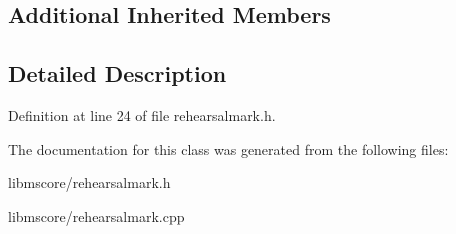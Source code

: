 \subsection*{Additional Inherited Members}


\subsection{Detailed Description}


Definition at line 24 of file rehearsalmark.\+h.



The documentation for this class was generated from the following files\+:\begin{DoxyCompactItemize}
\item 
libmscore/rehearsalmark.\+h\item 
libmscore/rehearsalmark.\+cpp\end{DoxyCompactItemize}
